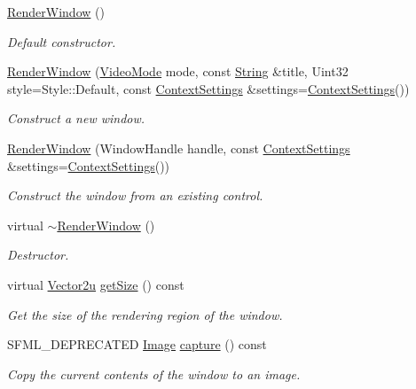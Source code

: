 \begin{DoxyCompactItemize}
\item 
\hyperlink{classsf_1_1_render_window_a839bbf336bdcafb084dafc3076fc9021}{Render\+Window} ()
\begin{DoxyCompactList}\small\item\em Default constructor. \end{DoxyCompactList}\item 
\hyperlink{classsf_1_1_render_window_aebef983e01f677bf5a66cefc4d547647}{Render\+Window} (\hyperlink{classsf_1_1_video_mode}{Video\+Mode} mode, const \hyperlink{classsf_1_1_string}{String} \&title, Uint32 style=Style\+::\+Default, const \hyperlink{structsf_1_1_context_settings}{Context\+Settings} \&settings=\hyperlink{structsf_1_1_context_settings}{Context\+Settings}())
\begin{DoxyCompactList}\small\item\em Construct a new window. \end{DoxyCompactList}\item 
\hyperlink{classsf_1_1_render_window_a25c0af7d515e710b6eebc9c6be952aa5}{Render\+Window} (Window\+Handle handle, const \hyperlink{structsf_1_1_context_settings}{Context\+Settings} \&settings=\hyperlink{structsf_1_1_context_settings}{Context\+Settings}())
\begin{DoxyCompactList}\small\item\em Construct the window from an existing control. \end{DoxyCompactList}\item 
virtual \hyperlink{classsf_1_1_render_window_a3407e36bfc1752d723140438a825365c}{$\sim$\+Render\+Window} ()
\begin{DoxyCompactList}\small\item\em Destructor. \end{DoxyCompactList}\item 
virtual \hyperlink{classsf_1_1_vector2}{Vector2u} \hyperlink{classsf_1_1_render_window_ae3eacf93661c8068fca7a78d57dc7e14}{get\+Size} () const
\begin{DoxyCompactList}\small\item\em Get the size of the rendering region of the window. \end{DoxyCompactList}\item 
S\+F\+M\+L\+\_\+\+D\+E\+P\+R\+E\+C\+A\+T\+ED \hyperlink{classsf_1_1_image}{Image} \hyperlink{classsf_1_1_render_window_a370137abe81f6b7d62b600ceeccd54d3}{capture} () const
\begin{DoxyCompactList}\small\item\em Copy the current contents of the window to an image. \end{DoxyCompactList}\end{DoxyCompactItemize}
